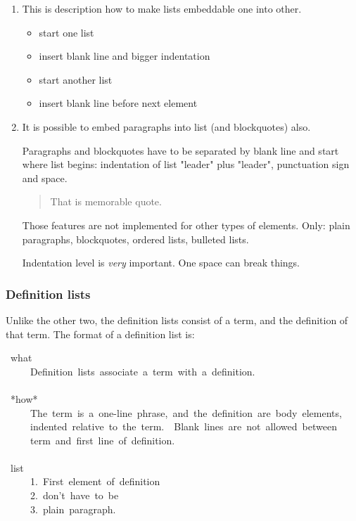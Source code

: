 \documentclass[12pt]{article}
\begin{document}
\begin{enumerate}[label=\arabic*.]
\item
This is description how to make lists embeddable
one into other.

 \begin{itemize}
\item
start one list

\item
insert blank line and bigger indentation

\item
start another list

\item
insert blank line before next element
\end{itemize}

\item
It is possible to embed paragraphs into list (and blockquotes)
also.

 Paragraphs and blockquotes have to be separated by blank line and
 start where list begins: indentation of list "leader" plus
 "leader", punctuation sign and space.

 \begin{quotation}
 That is memorable quote.
 \end{quotation}

 Those features are not implemented for other types of elements. Only:
 plain paragraphs, blockquotes, ordered lists, bulleted lists.

 Indentation level is \emph{very} important. One space can break things.
\end{enumerate}
\hypertarget{ldefinition-lists}{}
\subsubsection{Definition lists}

Unlike the other two, the definition lists consist of a term, and
the definition of that term. The format of a definition list is:

\begin{ttfamily}\begin{flushleft}
\mbox{~what}\\
\mbox{~~~~~Definition~lists~associate~a~term~with~a~definition.}\\
\mbox{}\\
\mbox{~*how*}\\
\mbox{~~~~~The~term~is~a~one-line~phrase,~and~the~definition~are~body~elements,}\\
\mbox{~~~~~indented~relative~to~the~term.~~Blank~lines~are~not~allowed~between}\\
\mbox{~~~~~term~and~first~line~of~definition.}\\
\mbox{}\\
\mbox{~list}\\
\mbox{~~~~~1.~First~element~of~definition}\\
\mbox{~~~~~2.~don't~have~to~be}\\
\mbox{~~~~~3.~plain~paragraph.}\\
\end{flushleft}\end{ttfamily}
\end{document}
